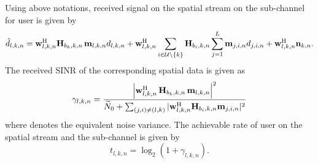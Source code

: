 Using above notations, received signal on the  spatial stream on the  sub-channel for user  is given by
\begin{equation}\label{eqn-1}
\hat{d}_{l,k,n} = \mvec{w}{l,k,n}^\herm \mvec{H}{b_k,k,n} \,\mvec{m}{l,k,n} d_{l,k,n} + \mvec{w}{l,k,n}^\herm \sum_{i \in \mc{U} \backslash \set{k}} \mvec{H}{b_i,k,n} \sum_{j = 1}^L \mvec{m}{j,i,n}d_{j,i,n} + \mvec{w}{l,k,n}^\herm \mvec{n}{k,n}.
\end{equation}
The received \ac{SINR} of the corresponding spatial data is given as
\begin{equation}\label{eq:SINR}
\gamma_{l,k,n} = \dfrac{\left |\mvec{w}{l,k,n}^\herm \, \mvec{H}{b_k,k,n} \, \mvec{m}{l,k,n} \right |^2}{\enoise + \sum_{(j,i) \neq (l,k)} |\mvec{w}{l,k,n}^\herm \mvec{H}{b_i,k,n} \mvec{m}{j,i,n} |^2}
\end{equation}
where  denotes the equivalent noise variance. The achievable rate of user  on the  spatial stream and the  sub-channel is given by 
\begin{equation}
t_{l,k,n} = \log_2 (1 + \gamma_{l,k,n}).
\end{equation}